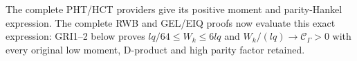 The complete PHT/HCT providers give its positive moment
and parity-Hankel expression. The complete RWB and GEL/EIQ
proofs now evaluate this exact expression: GRI1--2 below proves
$lq/64\leq W_k\leq6lq$ and
$W_k/(lq)\to\mathcal C_\Gamma>0$ with every original
low moment, D-product and high parity factor retained.